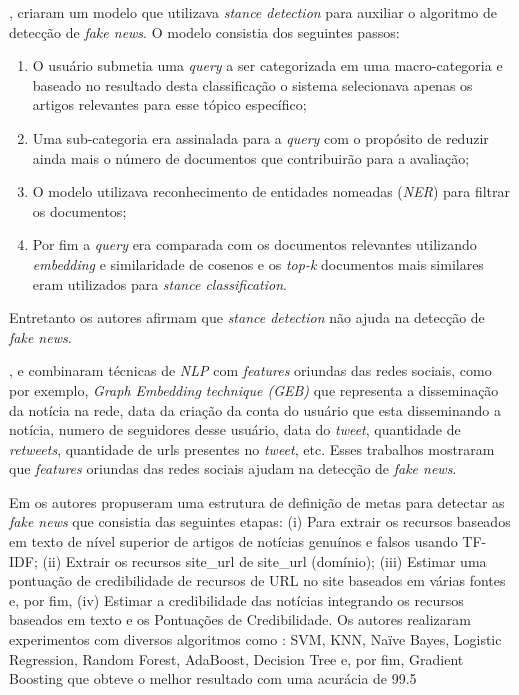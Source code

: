 \citet{DeMagistris2022},  criaram um modelo que utilizava \textit{stance detection} para auxiliar o algoritmo de detecção de \textit{fake news}. 
O modelo consistia dos seguintes passos: 
\begin{enumerate}
    \item  O usuário submetia uma \textit{query} a ser categorizada em uma macro-categoria e baseado no resultado desta classificação o sistema selecionava apenas os artigos relevantes para esse tópico específico; 
    \item Uma sub-categoria era assinalada para a \textit{query} com o propósito de reduzir ainda mais o número de documentos que contribuirão para a avaliação; 
    \item O modelo utilizava reconhecimento de entidades nomeadas (\textit{NER}) para filtrar os documentos; 
    \item Por fim a \textit{query} era comparada com os documentos relevantes utilizando \textit{embedding} e similaridade de cosenos e os \textit{top-k} documentos mais similares eram utilizados para \textit{stance classification}. 
    \end{enumerate}
    Entretanto os autores afirmam que \textit{stance detection} não ajuda na detecção de \textit{fake news}.


\citet{Wu2021530}, e \citet{Mouratidis20211} combinaram técnicas de \textit{NLP} com \textit{features} oriundas das redes sociais, como por exemplo, \textit{Graph Embedding technique (GEB)} que representa a disseminação da notícia na rede, data da criação da conta do usuário que esta disseminando a notícia, numero de seguidores desse usuário, data do \textit{tweet}, quantidade de \textit{retweets}, quantidade de urls presentes no \textit{tweet}, etc. 
Esses trabalhos mostraram que \textit{features} oriundas das redes sociais ajudam na detecção de \textit{fake news}.

Em \citet{SelvaBirunda2021406} os autores propuseram uma estrutura de definição de metas para detectar as \textit{fake news} que consistia das seguintes etapas: (i) Para extrair os recursos baseados em texto de nível superior de artigos de notícias genuínos e falsos usando TF-IDF; (ii) Extrair os recursos site\_url de site\_url (domínio); (iii) Estimar uma pontuação de credibilidade de recursos de URL no site baseados em várias fontes e, por fim, (iv) Estimar a credibilidade das notícias integrando os recursos baseados em texto e os Pontuações de Credibilidade. Os autores realizaram experimentos com diversos algoritmos como : SVM, KNN, Naïve Bayes, Logistic Regression, Random Forest, AdaBoost, Decision Tree e, por fim, Gradient Boosting que obteve o melhor resultado com uma acurácia de 99.5%

